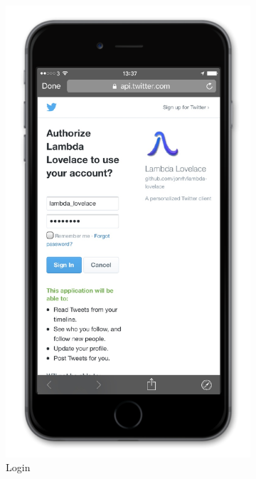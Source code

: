 \documentclass{article}
\begin{document}
\begin{figure}[H]
    \begin{subfigure}[b]{0.48\textwidth}
        \includegraphics[width=\textwidth]{iphone_3_login_filled}
        \caption{Login}
    \end{subfigure}
    ~ 
    \begin{subfigure}[b]{0.48\textwidth}

\end{subfigure}
\end{figure}
\end{document}
